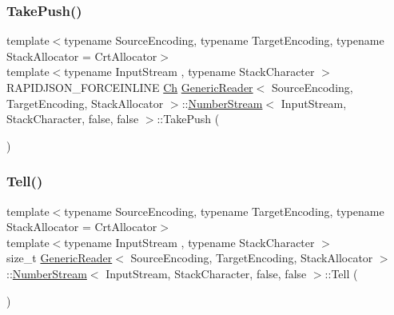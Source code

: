 \subsubsection{\texorpdfstring{Take\+Push()}{TakePush()}}
{\footnotesize\ttfamily template$<$typename Source\+Encoding, typename Target\+Encoding, typename Stack\+Allocator = Crt\+Allocator$>$ \\
template$<$typename Input\+Stream , typename Stack\+Character $>$ \\
R\+A\+P\+I\+D\+J\+S\+O\+N\+\_\+\+F\+O\+R\+C\+E\+I\+N\+L\+I\+NE \hyperlink{classGenericReader_1_1NumberStream_3_01InputStream_00_01StackCharacter_00_01false_00_01false_01_4_a2971d286306cf8df899b87ea9dd24f27}{Ch} \hyperlink{classGenericReader}{Generic\+Reader}$<$ Source\+Encoding, Target\+Encoding, Stack\+Allocator $>$\+::\hyperlink{classGenericReader_1_1NumberStream}{Number\+Stream}$<$ Input\+Stream, Stack\+Character, false, false $>$\+::Take\+Push (\begin{DoxyParamCaption}{ }\end{DoxyParamCaption})\hspace{0.3cm}{\ttfamily [inline]}}

\mbox{\label{classGenericReader_1_1NumberStream_3_01InputStream_00_01StackCharacter_00_01false_00_01false_01_4_a3317119c59d24c688599292bbae8c78f}} 
\subsubsection{\texorpdfstring{Tell()}{Tell()}}
{\footnotesize\ttfamily template$<$typename Source\+Encoding, typename Target\+Encoding, typename Stack\+Allocator = Crt\+Allocator$>$ \\
template$<$typename Input\+Stream , typename Stack\+Character $>$ \\
size\+\_\+t \hyperlink{classGenericReader}{Generic\+Reader}$<$ Source\+Encoding, Target\+Encoding, Stack\+Allocator $>$\+::\hyperlink{classGenericReader_1_1NumberStream}{Number\+Stream}$<$ Input\+Stream, Stack\+Character, false, false $>$\+::Tell (\begin{DoxyParamCaption}{ }\end{DoxyParamCaption})\hspace{0.3cm}{\ttfamily [inline]}}



